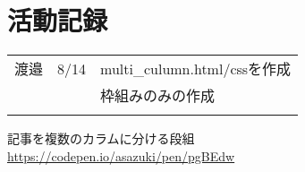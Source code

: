 \documentclass{jsarticle}
\begin{document}
\section{活動記録}

\begin{table}[htb]
    \begin{tabular}{c|c|l} \hline
        渡邉 & 8/14 & multi\_culumn.html/cssを作成\\
             &      & 枠組みのみの作成 \\
             &      & \\ \hline
    \end{tabular}
\end{table}

\begin{thebibliography}{99}
    \bibitem{} 記事を複数のカラムに分ける段組 \\
    \url{https://codepen.io/asazuki/pen/pgBEdw}
\end{thebibliography}
\end{document}
